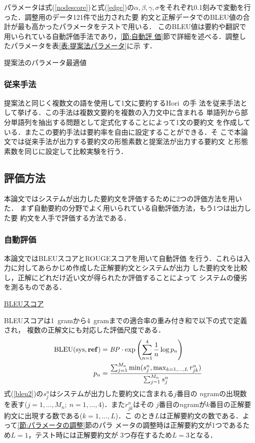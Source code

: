 \documentclass[japanese]{jnlp_1.4}
\newcounter{exp}
\begin{document}
パラメータは式(\ref{nodescore})と式(\ref{edge})の$\alpha, \beta, \gamma,
\sigma$をそれぞれ0.1刻みで変動を行った．調整用のデータ121件で出力された要
約文と正解データでのBLEU値の合計が最も高かったパラメータをテストで用いる．
このBLEU値は要約や翻訳で用いられている自動評価手法であり，\ref{節:自動評
価}節で詳細を述べる．調整したパラメータを表\ref{表:提案法パラメータ}に示
す．

\begin{table}[t]
\caption{提案法のパラメータ最適値} \label{表:提案法パラメータ}

\end{table}


\subsubsection{従来手法}\label{節:比較手法}

提案法と同じく複数文の語を使用して1文に要約するHori~\cite{hori:2002th}の手
法を従来手法として挙げる．この手法は複数文要約を複数の入力文中に含まれる
単語列から部分単語列を抽出する問題として定式化することによって1文の要約文
を作成している．またこの要約手法は要約率を自由に設定することができる．そ
こで本論文では従来手法が出力する要約文の形態素数と提案法が出力する要約文
と形態素数を同じに設定して比較実験を行う．


\subsection{評価方法}\label{節:評価方法}

本論文ではシステムが出力した要約文を評価するために2つの評価方法を用いた．
まず自動要約の分野でよく用いられている自動評価方法，もう1つは出力した要
約文を人手で評価する方法である．


\subsubsection{自動評価}\label{節:自動評価}

本論文ではBLEUスコアとROUGEスコア\cite{ROUGE}を用いて自動評価
を行う．これらは入力に対してあらかじめ作成した正解要約文とシステムが出力
した要約文を比較し，正解にどれだけ近い文が得られたか評価することによって
システムの優劣を測るものである．

\noindent \ul{\mbox{BLEUスコア}}

BLEUスコアは1~gramから4~gramまでの適合率の重み付き和で以下の式で定義され，
複数の正解文にも対応した評価尺度である．
\begin{align}
 {\rm BLEU}({\rm sys},{\bf ref}) & = \mathit{BP}\cdot{\rm exp}\left(\sum_{n=1}^{4}\frac{1}{n}\log p_n\right)
	\label{bleu1}\\
 p_n & = \frac{\sum^{M_n}_{j=1}\min(s^n_j,\max_{k=1,\dots,L}r_{jk}^n)}{\sum^{M_n}_{j=1}s^n_j}
	\label{bleu2}
\end{align}
式(\ref{bleu2})の$s_j^n$はシステムが出力した要約文に含まれる$j$番目の
$n$gramの出現数を表す($j=1,...,M_n;\ n=1,...,4$)．また$r_{jk}^n$はその
$j$番目の$n$gramが$k$番目の正解要約文に出現する数である($k=1,...,L$)．こ
のとき$L$は正解要約文の数である．よって\ref{節:パラメータの調整}節のパラ
メータの調整時は正解要約文が1つであるため$L=1$，テスト時には正解要約文が
3つ存在するため$L=3$となる．
\end{document}
